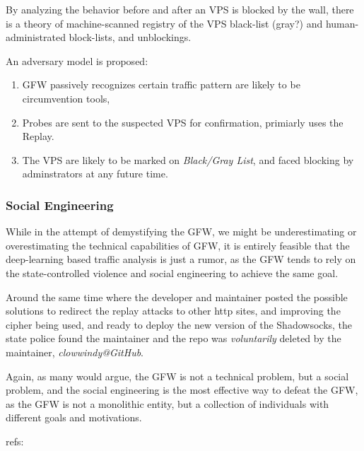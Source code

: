 By analyzing the behavior before and after an VPS is blocked by the
wall, there is a theory of machine-scanned registry of the VPS
black-list (gray?) and human-administrated block-lists, and unblockings.

An adversary model is proposed:

\begin{enumerate}
\def\labelenumi{\arabic{enumi}.}
\item
  GFW passively recognizes certain traffic pattern are likely to be
  circumvention tools,
\item
  Probes are sent to the suspected VPS for confirmation, primiarly uses
  the Replay.
\item
  The VPS are likely to be marked on \emph{Black/Gray List}, and faced
  blocking by adminstrators at any future time.
\end{enumerate}

\hypertarget{social-engineering}{%
\subsubsection{Social Engineering}\label{social-engineering}}

While in the attempt of demystifying the GFW, we might be
underestimating or overestimating the technical capabilities of GFW, it
is entirely feasible that the deep-learning based traffic analysis is
just a rumor, as the GFW tends to rely on the state-controlled violence
and social engineering to achieve the same goal.

Around the same time where the developer and maintainer posted the
possible solutions to redirect the replay attacks to other http sites,
and improving the cipher being used, and ready to deploy the new version
of the Shadowsocks, the state police found the maintainer and the repo
was \emph{voluntarily} deleted by the maintainer,
\emph{clowwindy@GitHub}. \cite{58_breakwaIssue}

Again, as many would argue, the GFW is not a technical problem, but a
social problem, and the social engineering is the most effective way to
defeat the GFW, as the GFW is not a monolithic entity, but a collection
of individuals with different goals and motivations.

refs:

